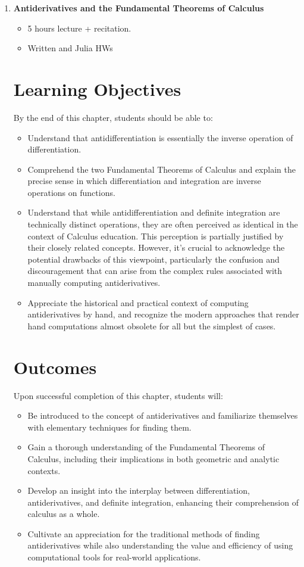 \documentclass[letterpaper]{book}
\begin{document}
\begin{enumerate}[label={\large\arabic*}, font=\large]
\bigskip

\item {\Large \bf Antiderivatives and the Fundamental Theorems of Calculus}
\begin{itemize}
    \item 5 hours lecture + recitation.
    \item Written and Julia HWs
\end{itemize}

\section*{Learning Objectives}

By the end of this chapter, students should be able to:
\begin{itemize}
    \item Understand that antidifferentiation is essentially the inverse operation of differentiation.
    \item Comprehend the two Fundamental Theorems of Calculus and explain the precise sense in which differentiation and integration are inverse operations on functions.
    \item Understand that while antidifferentiation and definite integration are technically distinct operations, they are often perceived as identical in the context of Calculus education. This perception is partially justified by their closely related concepts. However, it's crucial to acknowledge the potential drawbacks of this viewpoint, particularly the confusion and discouragement that can arise from the complex rules associated with manually computing antiderivatives.

    \item Appreciate the historical and practical context of computing antiderivatives by hand, and recognize the modern approaches that render hand computations almost obsolete for all but the simplest of cases.
\end{itemize}


\section*{Outcomes}

Upon successful completion of this chapter, students will:
\begin{itemize}
    \item Be introduced to the concept of antiderivatives and familiarize themselves with elementary techniques for finding them.
    \item Gain a thorough understanding of the Fundamental Theorems of Calculus, including their implications in both geometric and analytic contexts.
    \item Develop an insight into the interplay between differentiation, antiderivatives, and definite integration, enhancing their comprehension of calculus as a whole.
    \item Cultivate an appreciation for the traditional methods of finding antiderivatives while also understanding the value and efficiency of using computational tools for real-world applications.
\end{itemize}



\end{enumerate}
\end{document}

